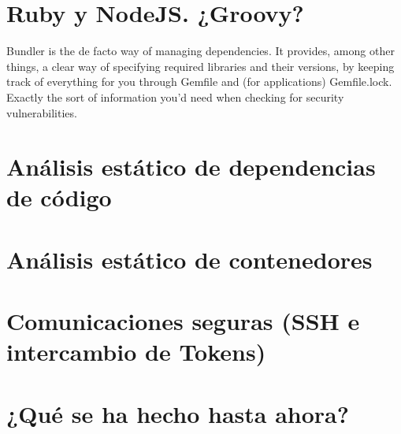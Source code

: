 \section{Ruby y NodeJS. ¿Groovy?}


Bundler is the de facto way of managing dependencies. It provides, among other things, a clear way of specifying required libraries and their versions, by keeping track of everything for you through Gemfile and (for applications) Gemfile.lock. Exactly the sort of information you’d need when checking for security vulnerabilities.

\section{Análisis estático de dependencias de código}


\section{Análisis estático de contenedores}


\section{Comunicaciones seguras (SSH e intercambio de Tokens)}

\section{¿Qué se ha hecho hasta ahora?}

\endinput